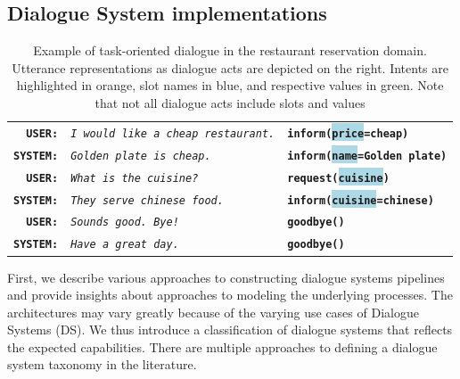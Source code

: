 \subsection{Dialogue System implementations}
\label{02:ds-background}
\begin{table}[tp]
\small
\setlength\fboxsep{2pt}
        \centering
        \begin{tabular}{rll}
        \textbf{\texttt{USER:}} & \textit{\texttt{I would like a cheap restaurant.}} & \textbf{\texttt{\colorbox{pastelyellow}{inform}(\colorbox{lightblue}{price}=\colorbox{pastelgreen}{cheap})}} \\
        \textbf{\texttt{SYSTEM:}} & \textit{\texttt{Golden plate is cheap.}} & \textbf{\texttt{\colorbox{pastelyellow}{inform}(\colorbox{lightblue}{name}=\colorbox{pastelgreen}{Golden plate})}} \\
        \hdashline[1.5pt/2pt]
        \textbf{\texttt{USER:}} & \textit{\texttt{What is the cuisine?}} & \textbf{\texttt{\colorbox{pastelyellow}{request}(\colorbox{lightblue}{cuisine})}} \\
        \textbf{\texttt{SYSTEM:}} & \textit{\texttt{They serve chinese food.}} & \textbf{\texttt{\colorbox{pastelyellow}{inform}(\colorbox{lightblue}{cuisine}=\colorbox{pastelgreen}{chinese})}} \\
        \hdashline[1.5pt/2pt]
        \textbf{\texttt{USER:}} & \textit{\texttt{Sounds good. Bye!}} & \textbf{\texttt{\colorbox{pastelyellow}{goodbye}()}} \\
        \textbf{\texttt{SYSTEM:}} & \textit{\texttt{Have a great day.}} & \textbf{\texttt{\colorbox{pastelyellow}{goodbye}()}} \\
        \end{tabular}
\normalsize
        \caption{Example of task-oriented dialogue in the restaurant reservation domain. Utterance representations as dialogue acts are depicted on the right. Intents are highlighted in orange, slot names in blue, and respective values in green. Note that not all dialogue acts include slots and values}
    \label{fig:das}
\end{table}
First, we describe various approaches to constructing dialogue systems pipelines and provide insights about approaches to modeling the underlying processes.
The architectures may vary greatly because of the varying use cases of Dialogue Systems (DS).
We thus introduce a classification of dialogue systems that reflects the expected capabilities.
There are multiple approaches to defining a dialogue system taxonomy in the literature.
